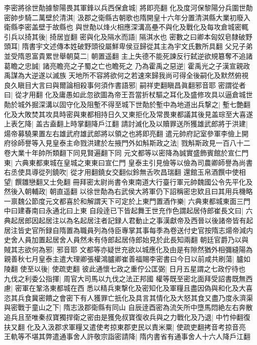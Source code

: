 李密將徐世勣據黎陽畏其軍鋒以兵西保倉城|{
	將即亮翻}
化及度河保黎陽分兵圍世勣密帥步騎二萬壁於清淇|{
	汲郡之衛縣古朝歌也隋開皇十六年分置清淇縣大業初廢入衛縣李密盖壁于故縣也}
與世勣以烽火相應深溝高壘不與化及戰化及每攻倉城密輒引兵以掎其後|{
	掎居豈翻}
密與化及隔水而語|{
	隔淇水也}
密數之曰卿本匈奴皂隸破野頭耳|{
	隋書宇文述傳本姓破野頭役屬鮮卑侯豆歸從其主為宇文氏數所具翻}
父兄子弟並受隋恩富貴累世舉朝莫二|{
	朝置遥翻}
主上失德不能死諫反行弑逆欲規簒奪不追諸葛瞻之忠誠|{
	諸亮瞻亮之子蜀之亡也瞻死之}
乃為霍禹之惡逆|{
	霍禹光之子漢宣親政禹謀為大逆遂以滅族}
天地所不容將欲何之若速來歸我尚可得全後嗣化及默然俯視良久瞋目大言曰與爾論相殺事何須作書語邪|{
	嗣祥吏翻瞋昌眞翻邪音耶}
密謂從者曰|{
	從才用翻}
化及庸愚如此忽欲圖為帝王吾當折杖驅之耳化及盛修攻具以逼倉城世勣於城外掘深溝以固守化及阻塹不得至城下世勣於塹中為地道出兵撃之|{
	塹七艶翻}
化及大敗焚其攻具時密與東都相持日久又東拒化及常畏東都議其後見盖琮至大喜遂上表乞降|{
	盖古盍翻上時掌翻降戶江翻}
請討滅化及以贖罪送所獲雄武郎將于洪建|{
	煬帝募驍果置左右雄武府雄武郎將以領之也將即亮翻}
遣元帥府記室參軍李儉上開府徐師譽等入見皇泰主命戮洪建於左掖門外如斛斯政之法|{
	戮斛斯政見一百八十二卷大業十年帥所類翻下同見賢遍翻下同}
元文都等以密降為誠實盛飾賓館於宣仁門東|{
	六典東都東城在皇城之東東曰宣仁門}
皇泰主引見儉等以儉為司農卿師譽為尚書右丞使具導從列鐃吹|{
	從才用翻鐃女交翻似鈴無舌吹昌瑞翻}
還館玉帛酒饌中使相望|{
	饌雛戀翻又士免翻}
冊拜密太尉尚書令東南道大行臺行軍元帥魏國公令先平化及然後入朝輔政|{
	朝直遥翻}
以徐世勣為右武侯大將軍仍下詔稱密忠欵且曰其用兵機略一禀魏公節度元文都喜於和解謂天下可定於上東門置酒作樂|{
	六典東都城東面三門中曰建春南曰永通北曰上東}
自段逹已下皆起舞王世充作色謂起居侍郎崔長文曰|{
	六典起居郎因起居注以為名起居注者記録人君動止之事漢獻帝及西晉以後諸帝皆有起居注皆史官所録自隋置為職員列為侍臣專掌其事每季為卷送付史官按隋志煬帝減内史舍人員加置起居舍人員然未有侍郎起居侍郎始見於此長知兩翻}
朝廷官爵乃以與賊其志欲何為邪|{
	邪音耶}
文都等亦疑世充欲以城應化及由是有隙然猶外相彌縫陽為親善秋七月皇泰主遣大理卿張權鴻臚卿崔善福賜李密書曰今日以前咸共刷蕩|{
	臚如陵翻}
使至以後|{
	使疏吏翻}
彼此通懷七政之重佇公匡弼|{
	日月五星謂之七政佇待也}
九伐之利委公指揮|{
	周官大司馬以九伐之法正邦國}
權等既至密北面拜受詔書既無西慮|{
	密軍在鞏洛東都城在西}
悉以精兵東撃化及密知化及軍糧且盡因偽與和化及大喜恣其兵食冀密饋之會密下有人獲罪亡扺化及具言其情化及大怒其食又盡乃度永濟渠與密戰于童山之下|{
	隋志汲郡衛縣有同山}
自辰逹酉密為流矢所中墮馬悶絶左右奔散追兵且至唯秦叔寶獨捍衛之密由是獲免叔寶復收兵與之力戰化及乃退|{
	中竹仲翻復扶又翻}
化及入汲郡求軍糧又遣使考掠東郡吏民以責米粟|{
	使疏吏翻拷音考掠音亮}
王軌等不堪其弊遣通事舍人許敬宗詣密請降|{
	隋内書省有通事舍人十六人降戶江翻}
